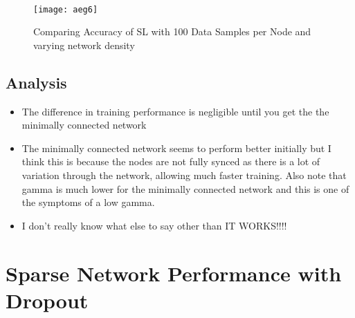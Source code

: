 \begin{figure}[H]
	 \\
	\texttt{[image: aeg6]}
	\caption{Comparing Accuracy of SL with 100 Data Samples per Node and varying network density}
	\label{aeg6}
\end{figure}

\subsection{Analysis}

\begin{itemize}
	\item The difference in training performance is negligible until you get the the minimally connected network
	\item The minimally connected network seems to perform better initially but I think this is because the nodes are not fully synced as there is a lot of variation through the network, allowing much faster training. Also note that gamma is much lower for the minimally connected network and this is one of the symptoms of a low gamma.
	\item I don't really know what else to say other than IT WORKS!!!!
\end{itemize}

\section{Sparse Network Performance with Dropout}
